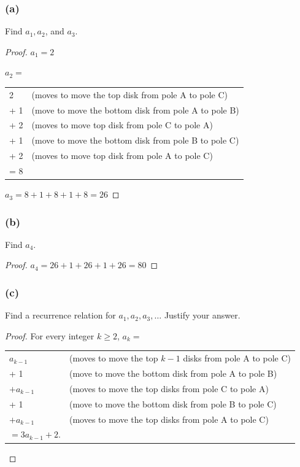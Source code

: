 \documentclass[14pt]{extarticle}
\begin{document}
\subsubsection{(a)}
Find $a_1, a_2$, and $a_3$.

\begin{proof}
$a_1 = 2$

$a_2 =$

\begin{tabular}{ll}
  2 & (moves to move the top disk from pole A to pole C) \\
+ 1 & (move to move the bottom disk from pole A to pole B) \\
+ 2 & (moves to move top disk from pole C to pole A) \\
+ 1 & (move to move the bottom disk from pole B to pole C) \\
+ 2 & (moves to move top disk from pole A to pole C) \\
= 8 & 
\end{tabular}

$a_3 = 8 + 1 + 8 + 1 + 8 = 26$
\end{proof}

\subsubsection{(b)}
Find $a_4$.

\begin{proof}
$a_4 = 26 + 1 + 26 + 1 + 26 = 80$
\end{proof}

\subsubsection{(c)}
Find a recurrence relation for $a_1, a_2, a_3, \ldots$ Justify your answer.

\begin{proof}
For every integer $k \geq 2$, $a_k =$

\begin{tabular}{ll}
$a_{k-1}$ & (moves to move the top $k - 1$ disks from pole A to pole C) \\
+ 1 & (move to move the bottom disk from pole A to pole B) \\
$+ a_{k-1}$ & (moves to move the top disks from pole C to pole A) \\
+ 1 & (move to move the bottom disk from pole B to pole C) \\
$+ a_{k-1}$ & (moves to move the top disks from pole A to pole C) \\
$= 3a_{k-1} + 2$. & 
\end{tabular}
\end{proof}
\end{document}
